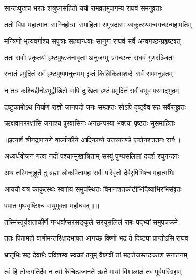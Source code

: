 \twolineshloka
{सान्तःपुरश्च भरतः शत्रुघ्नसहितो ययौ}
{रामव्रतमुपागम्य राघवं समनुव्रताः} %

\twolineshloka
{ततो विप्रा महात्मानः साग्निहोत्राः समाहिताः}
{सपुत्रदाराः काकुत्स्थमन्वगच्छन्महामतिम्} %

\twolineshloka
{मन्त्रिणो भृत्यवर्गाश्च सपुत्राः सहबान्धवाः}
{सानुगा राघवं सर्वे अन्वगच्छन्प्रहृष्टवत्} %

\twolineshloka
{ततः सर्वाः प्रकृतयो हृष्टपुष्टजनावृताः}
{अनुजग्मुः प्रगच्छन्तं राघवं गुणरञ्जिताः} %

\twolineshloka
{स्नातं प्रमुदितं सर्वं हृष्टपुष्पमनुत्तमम्}
{दृप्तं किलिकिलाशब्दैः सर्वं राममनुव्रतम्} %

\twolineshloka
{न तत्र कश्चिद्दीनोऽभूद्व्रीडितो वापि दुःखितः}
{हृष्टं प्रमुदितं सर्वं बभूव परमाद्भुतम्} %

\twolineshloka
{द्रष्टुकामोऽथ निर्याणं राज्ञो जानपदो जनः}
{सम्प्राप्तः सोऽपि दृष्ट्वैव सह सर्वैरनुव्रतः} %

\twolineshloka
{ऋक्षवानररक्षांसि जनाश्च पुरवासिनः}
{अगछन्परया भक्त्या पृष्ठतः सुसमाहिताः} %


{॥इत्यार्षे श्रीमद्रामायणे वाल्मीकीये आदिकाव्ये उत्तरकाण्डे एकोनशततमः सर्गः॥}


\twolineshloka
{अध्यर्धयोजनं गत्वा नदीं पश्चान्मुखाश्रिताम्}
{सरयूं पुण्यसलिलां ददर्श रघुनन्दनः} %

\twolineshloka
{अथ तस्मिन्मुहूर्ते तु ब्रह्मा लोकपितामहः}
{सर्वैः परिवृतो देवैरृषिभिश्च महात्मभिः} %

\twolineshloka
{आययौ यत्र काकुत्स्थः स्वर्गाय समुपस्थितः}
{विमानशतकोटीभिर्दिव्याभिरभिसंवृतः} %

{पपात पुष्पवृष्टिश्च वायुमुक्ता महौघवत्॥॥} %

\addtocounter{shlokacount}{1}

\twolineshloka
{तस्मिंस्तूर्यशताकीर्णे गन्धर्वाप्सरसङ्कुले}
{सरयूसलिलं रामः पद्भ्यां समुपचक्रमे} %

\twolineshloka
{ततः पितामहो वाणीमन्तरिक्षादभाषत}
{आगच्छ विष्णो भद्रं ते दिष्ट्या प्राप्तोऽसि राघव} %

\twolineshloka
{भ्रातृभिः सह देवाभैः प्रविशस्व स्वकां तनुम्}
{वैष्णवीं तां महातेजस्तदाकाशं सनातनम्} %

\twolineshloka
{त्वं हि लोकगतिर्देव न त्वां केचित्प्रजानते}
{ऋते मायां विशालाक्ष तव पूर्वपरिग्रहाम्} %

